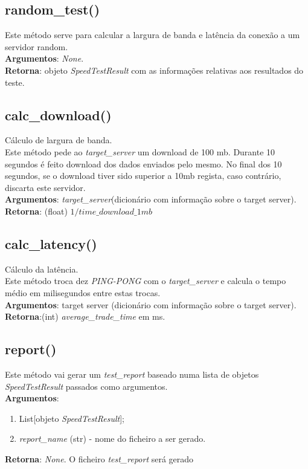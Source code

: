 \documentclass{report}
\begin{document}
\subsection{random\_test()}
\label{subsec.randt}
Este método serve para calcular a largura de banda e latência da conexão a um servidor random.\\ 
\textbf{Argumentos}: \textit{None}.\\
\textbf{Retorna}: objeto \textit{SpeedTestResult} com as informações relativas aos resultados do teste.


\subsection{calc\_download()}
\label{subsec.download}
Cálculo de largura de banda.\\
Este método pede ao \textit{target\_server} um download de 100 mb. Durante 10 segundos é feito download dos dados enviados pelo mesmo. No final dos 10 segundos, se o download tiver sido superior a 10mb regista, caso contrário, discarta este servidor.\\
\textbf{Argumentos}: \textit{target\_server}(dicionário com informação sobre o target server). 
\textbf{Retorna}: (float) $1/\textit{time\_download\_1mb}$

\subsection{calc\_latency()}
\label{subsec.latency}
Cálculo da latência.\\ 
Este método troca dez \textit{PING-PONG} com o \textit{target\_server} e calcula o tempo médio em milisegundos entre estas trocas.\\
\textbf{Argumentos}: target server (dicionário com informação sobre o target server). 
\textbf{Retorna}:(int) \textit{average\_trade\_time} em ms.

\subsection{report()}
\label{subsec.report}
Este método vai gerar um \textit{test\_report} baseado numa lista de objetos \textit{SpeedTestResult} passados como argumentos.\\ 
\textbf{Argumentos}:
\begin{enumerate}
\item List[objeto \textit{SpeedTestResult}];
\item \textit{report\_name} (str) - nome do ficheiro a ser gerado.
\end{enumerate}
\textbf{Retorna}: \textit{None}. O ficheiro \textit{test\_report} será gerado
\end{document}
